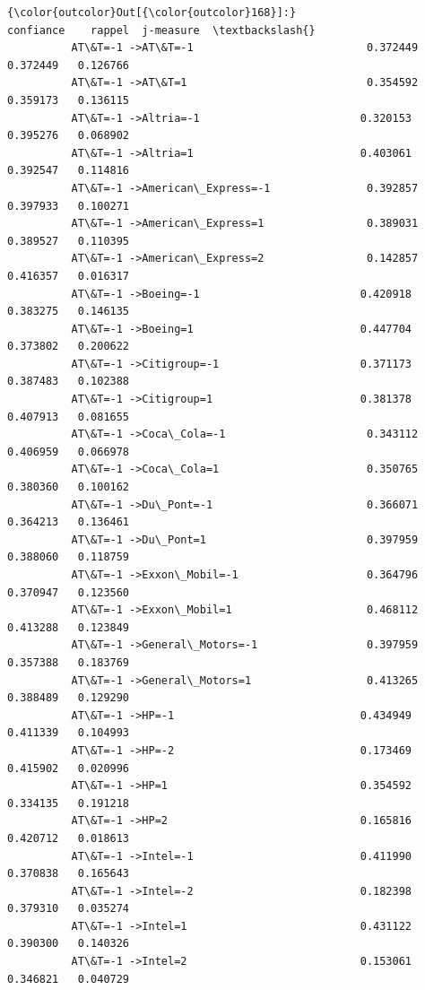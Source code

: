 \documentclass[11pt]{article}
\begin{document}
\begin{Verbatim}[commandchars=\\\{\}]
{\color{outcolor}Out[{\color{outcolor}168}]:}                                            confiance    rappel  j-measure  \textbackslash{}
          AT\&T=-1 ->AT\&T=-1                           0.372449  0.372449   0.126766   
          AT\&T=-1 ->AT\&T=1                            0.354592  0.359173   0.136115   
          AT\&T=-1 ->Altria=-1                         0.320153  0.395276   0.068902   
          AT\&T=-1 ->Altria=1                          0.403061  0.392547   0.114816   
          AT\&T=-1 ->American\_Express=-1               0.392857  0.397933   0.100271   
          AT\&T=-1 ->American\_Express=1                0.389031  0.389527   0.110395   
          AT\&T=-1 ->American\_Express=2                0.142857  0.416357   0.016317   
          AT\&T=-1 ->Boeing=-1                         0.420918  0.383275   0.146135   
          AT\&T=-1 ->Boeing=1                          0.447704  0.373802   0.200622   
          AT\&T=-1 ->Citigroup=-1                      0.371173  0.387483   0.102388   
          AT\&T=-1 ->Citigroup=1                       0.381378  0.407913   0.081655   
          AT\&T=-1 ->Coca\_Cola=-1                      0.343112  0.406959   0.066978   
          AT\&T=-1 ->Coca\_Cola=1                       0.350765  0.380360   0.100162   
          AT\&T=-1 ->Du\_Pont=-1                        0.366071  0.364213   0.136461   
          AT\&T=-1 ->Du\_Pont=1                         0.397959  0.388060   0.118759   
          AT\&T=-1 ->Exxon\_Mobil=-1                    0.364796  0.370947   0.123560   
          AT\&T=-1 ->Exxon\_Mobil=1                     0.468112  0.413288   0.123849   
          AT\&T=-1 ->General\_Motors=-1                 0.397959  0.357388   0.183769   
          AT\&T=-1 ->General\_Motors=1                  0.413265  0.388489   0.129290   
          AT\&T=-1 ->HP=-1                             0.434949  0.411339   0.104993   
          AT\&T=-1 ->HP=-2                             0.173469  0.415902   0.020996   
          AT\&T=-1 ->HP=1                              0.354592  0.334135   0.191218   
          AT\&T=-1 ->HP=2                              0.165816  0.420712   0.018613   
          AT\&T=-1 ->Intel=-1                          0.411990  0.370838   0.165643   
          AT\&T=-1 ->Intel=-2                          0.182398  0.379310   0.035274   
          AT\&T=-1 ->Intel=1                           0.431122  0.390300   0.140326   
          AT\&T=-1 ->Intel=2                           0.153061  0.346821   0.040729   

\end{Verbatim}
\end{document}
